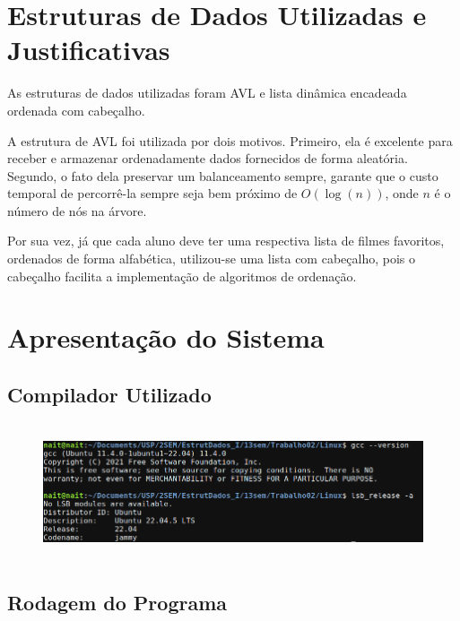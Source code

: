 \documentclass[12pt,a4paper,portuguese]{article}
\begin{document}
    \section{Estruturas de Dados Utilizadas e Justificativas}
        As estruturas de dados utilizadas foram AVL e lista dinâmica encadeada ordenada com cabeçalho.

        A estrutura de AVL foi utilizada por dois motivos. Primeiro, ela é excelente para receber e armazenar ordenadamente dados fornecidos de forma aleatória. Segundo, o fato dela preservar um balanceamento sempre, garante que o custo temporal de percorrê-la sempre seja bem próximo de $O(\log(n))$, onde $n$ é o número de nós na árvore.

        Por sua vez, já que cada aluno deve ter uma respectiva lista de filmes favoritos, ordenados de forma alfabética, utilizou-se uma lista com cabeçalho, pois o cabeçalho facilita a implementação de algoritmos de ordenação.

    \setcounter{section}{2}
    \section{Apresentação do Sistema}
        \subsection{Compilador Utilizado}

        \begin{figure}[H]
            \centering
            \includegraphics[height=4cm]{imgs/versao_compilador.png}
        \end{figure}

        \subsection{Rodagem do Programa}
\end{document}
